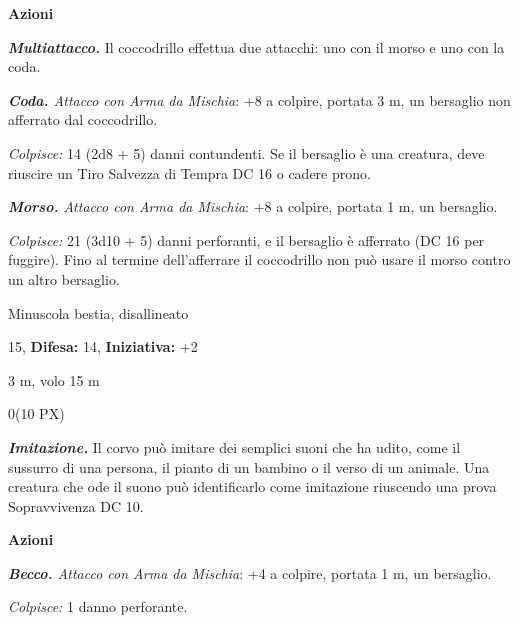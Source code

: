 \begin{multicols}{2}
{\textbf{Azioni}

\emph{\textbf{Multiattacco.}} Il coccodrillo effettua due attacchi: uno con il morso e uno con la coda.

\emph{\textbf{Coda.} Attacco con Arma da Mischia}: +8 a colpire, portata 3 m, un bersaglio non afferrato dal coccodrillo.

\emph{Colpisce:} 14 (2d8 + 5) danni contundenti. Se il bersaglio è una creatura, deve riuscire un Tiro Salvezza di Tempra DC 16 o cadere prono.

\emph{\textbf{Morso.} Attacco con Arma da Mischia}: +8 a colpire, portata 1 m, un bersaglio.

\emph{Colpisce:} 21 (3d10 + 5) danni perforanti, e il bersaglio è afferrato (DC 16 per fuggire). Fino al termine dell'afferrare il coccodrillo non può usare il morso contro un altro bersaglio.

\begin{description}[noitemsep, topsep=0pt, parsep=0pt, partopsep=0pt, leftmargin=0cm, labelwidth=2.2cm]
    \item[\textbf{Taglia/Tipo:}] Minuscola bestia, disallineato
    \item[\textbf{Caratt.:}] 
    \item[\textbf{Punti Ferita:}] 15,  \textbf{Difesa:} 14,  \textbf{Iniziativa:} +2
    \item[\textbf{Tiri Salvez.:}] 
    \item[\textbf{Movimento:}] 3 m, volo 15 m
    \item[\textbf{Sfida:}] 0(10 PX)\smallskip
\end{description}

\emph{\textbf{Imitazione.}} Il corvo può imitare dei semplici suoni che ha udito, come il sussurro di una persona, il pianto di un bambino o il verso di un animale. Una creatura che ode il suono può identificarlo come imitazione riuscendo una prova Sopravvivenza DC 10.

\textbf{Azioni}

\emph{\textbf{Becco.} Attacco con Arma da Mischia}: +4 a colpire, portata 1 m, un bersaglio.

\emph{Colpisce:} 1 danno perforante.

}
\end{multicols}
